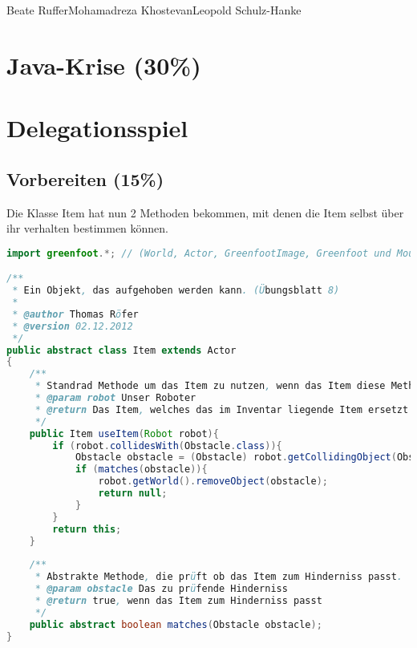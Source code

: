 \documentclass{pi1}
\begin{document}
		{Beate Ruffer}{Mohamadreza Khostevan}{Leopold Schulz-Hanke}

\section{Java-Krise (30\%)}

\section{Delegationsspiel}

\subsection{Vorbereiten (15\%)}

Die Klasse Item hat nun 2 Methoden bekommen, mit denen die Item selbst über ihr verhalten bestimmen können.
\begin{lstlisting}[caption={Klasse \emph{Item}}, firstnumber=1, language=Java]
import greenfoot.*; // (World, Actor, GreenfootImage, Greenfoot und MouseInfo)

/**
 * Ein Objekt, das aufgehoben werden kann. (Übungsblatt 8)
 * 
 * @author Thomas Röfer
 * @version 02.12.2012
 */
public abstract class Item extends Actor
{
    /**
     * Standrad Methode um das Item zu nutzen, wenn das Item diese Methode nicht überschreibt
     * @param robot Unser Roboter
     * @return Das Item, welches das im Inventar liegende Item ersetzt
     */
    public Item useItem(Robot robot){
        if (robot.collidesWith(Obstacle.class)){
            Obstacle obstacle = (Obstacle) robot.getCollidingObject(Obstacle.class);
            if (matches(obstacle)){
                robot.getWorld().removeObject(obstacle);
                return null;
            }
        }
        return this;
    }
    
    /**
     * Abstrakte Methode, die prüft ob das Item zum Hinderniss passt.
     * @param obstacle Das zu prüfende Hinderniss
     * @return true, wenn das Item zum Hinderniss passt
     */
    public abstract boolean matches(Obstacle obstacle);
}

\end{lstlisting}
\end{document}
